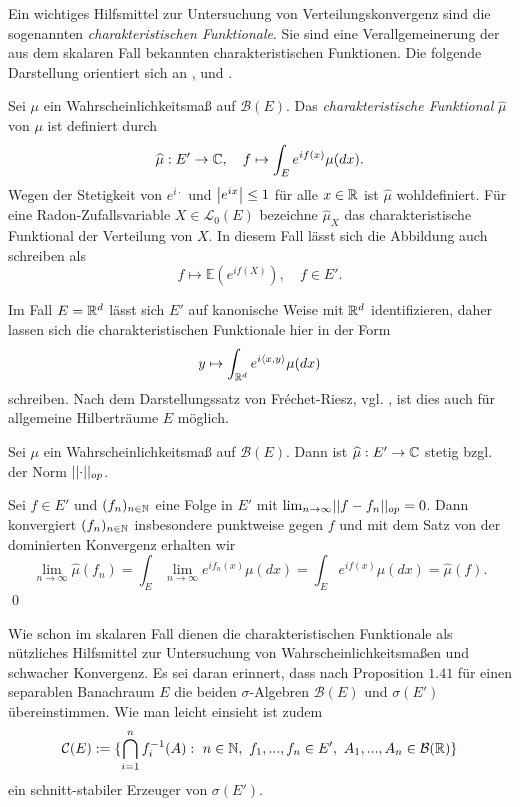 Ein wichtiges Hilfsmittel zur Untersuchung von Verteilungskonvergenz sind die sogenannten \textit{charakteristischen Funktionale}. 
Sie sind eine Verallgemeinerung der aus dem skalaren Fall bekannten charakteristischen Funktionen. Die folgende Darstellung orientiert sich an \cite{isem}, \cite{li-queffelec} und \cite{ito-nisio}.  

\begin{mydef}
    Sei $\mu$ ein Wahrscheinlichkeitsmaß auf $\mathcal{B}(E)$. 
    Das \textit{charakteristische Funktional} $\widehat{\mu}$ von $\mu$ ist definiert durch
    $$
        \widehat{\mu} : E' \to \mathbb{C}, \quad f \mapsto \int_{E}e^{if(x)}\mu(dx).
    $$
    Wegen der Stetigkeit von $e^{i\cdot}$ und $\left| e^{ix} \right|\leq 1$ für alle $x \in \mathbb{R}$ ist $\widehat{\mu}$ wohldefiniert. 
    Für eine Radon-Zufallsvariable $X \in \mathcal{L}_0(E)$ bezeichne $\widehat{\mu}_X$ das charakteristische Funktional der Verteilung von $X$. In diesem Fall lässt sich die Abbildung auch schreiben als
    $$
        f \mapsto \mathbb{E}(e^{if(X)}), \quad f \in E'. 
    $$
\end{mydef}

\begin{remark}
    Im Fall $E = \mathbb{R}^d$ lässt sich $E'$ auf kanonische Weise mit $\mathbb{R}^d$ identifizieren, daher lassen sich die charakteristischen Funktionale hier in der Form 
    $$
        y \mapsto \int_{\mathbb{R}^d}e^{i\langle x, y\rangle}\mu(dx)
    $$
    schreiben. Nach dem Darstellungssatz von Fréchet-Riesz, vgl. \cite[Theorem V.3.6]{werner}, ist dies auch für allgemeine Hilberträume $E$ möglich. 
\end{remark}

\begin{proposition}
    Sei $\mu$ ein Wahrscheinlichkeitsmaß auf $\mathcal{B}(E)$. Dann ist $\widehat{\mu}:E' \to \mathbb{C}$ stetig bzgl. der Norm $\lvert\lvert \cdot \rvert\rvert_{op}$. 
\end{proposition}
\begin{proof*}
    Sei $f \in E'$ und $(f_n)_{n \in \mathbb{N}}$ eine Folge in $E'$ mit $\lim_{n \to \infty}\lvert\lvert f-f_n \rvert\rvert_{op} = 0$. 
    Dann konvergiert $(f_n)_{n \in \mathbb{N}}$ insbesondere punktweise gegen $f$ und mit dem Satz von der dominierten Konvergenz erhalten wir 
    $$
        \lim_{n \to \infty} \widehat{\mu}(f_n) = \int_E\lim_{n \to \infty}e^{if_n(x)}\mu(dx) = \int_E e^{if(x)}\mu(dx) = \widehat{\mu}(f). 
    $$
    \qed
\end{proof*}

Wie schon im skalaren Fall dienen die charakteristischen Funktionale als nützliches Hilfsmittel zur Untersuchung von Wahrscheinlichkeitsmaßen und schwacher Konvergenz.
Es sei daran erinnert, dass nach Proposition $1.41$ für einen separablen Banachraum $E$ die beiden $\sigma$-Algebren $\mathcal{B}(E)$ und $\sigma(E')$ übereinstimmen. 
Wie man leicht einsieht ist zudem
$$
    \mathcal{C}(E) := \{ \bigcap_{i=1}^n f_i^{-1}(A): \ n \in \mathbb{N}, \ f_1,...,f_n \in E', \ A_1,...,A_n \in \mathcal{B}(\mathbb{R}) \}
$$ 
ein schnitt-stabiler Erzeuger von $\sigma(E')$. 

